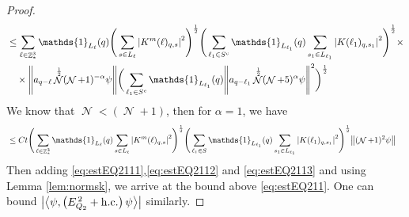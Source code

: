 \documentclass[12pt,a4paper]{article}
\numberwithin{equation}{section}
\newcommand{\1}{\mathbb{I}}
\DeclareMathOperator{\Z}{\mathbb{Z}}
\DeclareMathOperator{\NN}{\mathcal{N}}
\newcommand{\half}{\frac{1}{2}}
\newcommand{\eva}[1]{\left\langle #1 \right\rangle}
\theoremstyle{plain}
\theoremstyle{definition}
\theoremstyle{remark}
\theoremstyle{plain}
\theoremstyle{definition}
\theoremstyle{remark}
\begin{document}
\begin{proof}
\begin{align}
		&\leq\sum\limits_{\ell\in \Z^3_*}  \mathds{1}_{L_{\ell}}(q) \Bigg(\sum\limits_{s \in L_{\ell}} \abs{K^m(\ell)_{q,s}}^2\Bigg)^\half \Bigg(\sum\limits_{ \ell_1\in S^c} \mathds{1}_{L_{\ell_1}}(q)\sum\limits_{s_1 \in L_{\ell_1}} \abs{K(\ell_1)_{q,s_1}}^2\Bigg)^\half \times \\ &\quad\times \norm{ a_{q-\ell} \NN^\half (\NN+1)^{-\alpha}\psi} \bigg(\sum\limits_{ \ell_1\in S^c} \mathds{1}_{L_{\ell_1}}(q) \norm{ a_{q-\ell_1} \NN^\half (\NN+5)^{\alpha} \psi }^2\bigg)^\half\nonumber\\
	\end{align}
	We know that $\NN<(\NN+1)$, then for $\alpha = 1$, we have
	\begin{align}
		&\leq Ct  \Bigg(\sum\limits_{\ell\in \Z^3_*}  \mathds{1}_{L_{\ell}}(q) \sum\limits_{s \in L_{\ell}} \abs{K^m(\ell)_{q,s}}^2\Bigg)^\half \Bigg(\sum\limits_{ \ell_1\in S} \mathds{1}_{L_{\ell_1}}(q)\sum\limits_{s_1 \in L_{\ell_1}} \abs{K(\ell_1)_{q,s_1}}^2\Bigg)^\half\norm{ (\NN+1)^2\psi}  \label{eq:estEQ2113c}
	\end{align}
	Then adding \eqref{eq:estEQ2111},\eqref{eq:estEQ2112} and \eqref{eq:estEQ2113} and using Lemma \ref{lem:normsk}, we arrive at the bound above \eqref{eq:estEQ211}. One can bound $\abs{\eva{\psi,\left(E^{\,2}_{Q_2}+\mathrm{h.c.}\right) \psi }}$ similarly.
\end{proof}
\end{document}
